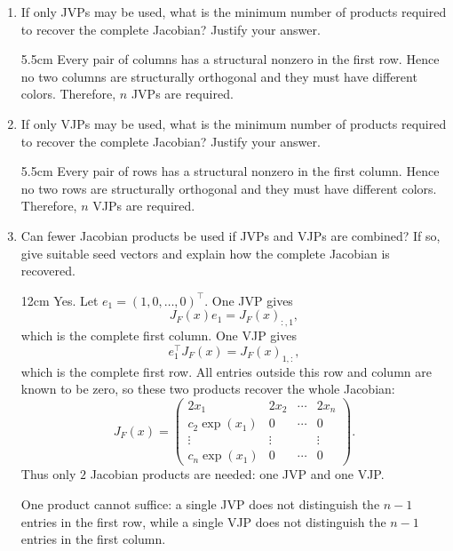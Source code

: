\begin{enumerate}
    \item If only JVPs may be used, what is the minimum number of products
    required to recover the complete Jacobian? Justify your answer.
    \begin{solutionbox}{5.5cm}
        Every pair of columns has a structural nonzero in the first row.
        Hence no two columns are structurally orthogonal and they must have
        different colors. Therefore, $\boxed{n}$ JVPs are required.
    \end{solutionbox}

    \item If only VJPs may be used, what is the minimum number of products
    required to recover the complete Jacobian? Justify your answer.
    \begin{solutionbox}{5.5cm}
        Every pair of rows has a structural nonzero in the first column.
        Hence no two rows are structurally orthogonal and they must have
        different colors. Therefore, $\boxed{n}$ VJPs are required.
    \end{solutionbox}

    \item Can fewer Jacobian products be used if JVPs and VJPs are combined?
    If so, give suitable seed vectors and explain how the complete Jacobian
    is recovered.
    \begin{solutionbox}{12cm}
        Yes. Let $e_1=(1,0,\ldots,0)^\top$. One JVP gives
        \[
            J_F(x)e_1=J_F(x)_{:,1},
        \]
        which is the complete first column. One VJP gives
        \[
            e_1^\top J_F(x)=J_F(x)_{1,:},
        \]
        which is the complete first row. All entries outside this row and
        column are known to be zero, so these two products recover the whole
        Jacobian:
        \[
            \boxed{J_F(x)=
            \begin{pmatrix}
                2x_1&2x_2&\cdots&2x_n\\
                c_2\exp(x_1)&0&\cdots&0\\
                \vdots&\vdots&&\vdots\\
                c_n\exp(x_1)&0&\cdots&0
            \end{pmatrix}.}
        \]
        Thus only $\boxed{2}$ Jacobian products are needed: one JVP and one
        VJP.

        One product cannot suffice: a single JVP does not distinguish the
        $n-1$ entries in the first row, while a single VJP does not
        distinguish the $n-1$ entries in the first column.
    \end{solutionbox}
\end{enumerate}
